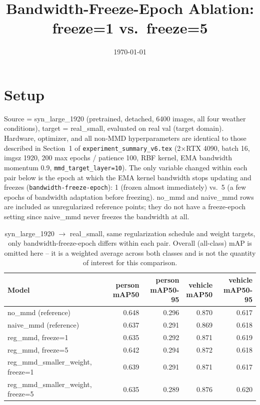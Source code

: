 \documentclass[11pt]{article}
\title{Bandwidth-Freeze-Epoch Ablation: freeze=1 vs.\ freeze=5}
\author{}
\date{\today}
\begin{document}
\maketitle

\section{Setup}

Source = syn\_large\_1920 (pretrained, detached, 6400 images, all four weather
conditions), target = real\_small, evaluated on real val (target domain). Hardware,
optimizer, and all non-MMD hyperparameters are identical to those described in
Section~1 of \texttt{experiment\_summary\_v6.tex} (2$\times$RTX 4090, batch 16,
imgsz 1920, 200 max epochs / patience 100, RBF kernel, EMA bandwidth momentum 0.9,
\texttt{mmd\_target\_layer=10}). The only variable changed within each pair below is
the epoch at which the EMA kernel bandwidth stops updating and freezes
(\texttt{bandwidth-freeze-epoch}): 1 (frozen almost immediately) vs.\ 5 (a few
epochs of bandwidth adaptation before freezing). no\_mmd and naive\_mmd rows are
included as unregularized reference points; they do not have a freeze-epoch setting
since naive\_mmd never freezes the bandwidth at all.

\begin{table}[h!]
    \centering
    \small
    \setlength{\tabcolsep}{6pt}
    \begin{tabular}{lrrrr}
        \toprule
        Model & \makecell{person\\mAP50} & \makecell{person\\mAP50-95} & \makecell{vehicle\\mAP50} & \makecell{vehicle\\mAP50-95} \\
        \midrule
        no\_mmd (reference) & 0.648 & 0.296 & 0.870 & 0.617 \\
        naive\_mmd (reference) & 0.637 & 0.291 & 0.869 & 0.618 \\
        \midrule
        reg\_mmd, freeze=1 & 0.635 & 0.292 & 0.871 & 0.619 \\
        reg\_mmd, freeze=5 & 0.642 & 0.294 & 0.872 & 0.618 \\
        \midrule
        reg\_mmd\_smaller\_weight, freeze=1 & 0.639 & 0.291 & 0.871 & 0.617 \\
        reg\_mmd\_smaller\_weight, freeze=5 & 0.635 & 0.289 & 0.876 & 0.620 \\
        \bottomrule
    \end{tabular}
    \caption{syn\_large\_1920 $\to$ real\_small, same regularization schedule and
    weight targets, only bandwidth-freeze-epoch differs within each pair. Overall
    (all-class) mAP is omitted here -- it is a weighted average across both classes
    and is not the quantity of interest for this comparison.}
\end{table}
\end{document}

